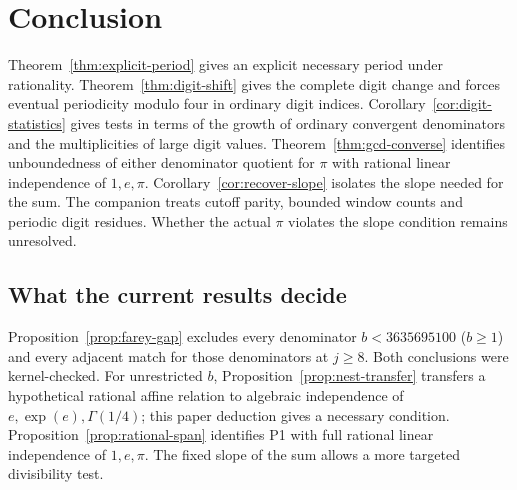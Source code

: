 \documentclass[11pt]{amsart}
\theoremstyle{definition}
\theoremstyle{remark}
\numberwithin{equation}{section}
\begin{document}
\section{Conclusion}\label{sec:conclusion}
Theorem~\ref{thm:explicit-period} gives an explicit necessary period under rationality. Theorem~\ref{thm:digit-shift} gives the complete digit change and forces eventual periodicity modulo four in ordinary digit indices. Corollary~\ref{cor:digit-statistics} gives tests in terms of the growth of ordinary convergent denominators and the multiplicities of large digit values. Theorem~\ref{thm:gcd-converse} identifies unboundedness of either denominator quotient for $\pi$ with rational linear independence of $1,e,\pi$. Corollary~\ref{cor:recover-slope} isolates the slope needed for the sum. The companion treats cutoff parity, bounded window counts and periodic digit residues. Whether the actual $\pi$ violates the slope condition remains unresolved.

\subsection{What the current results decide}\label{sec:current-results}
Proposition~\ref{prop:farey-gap} excludes every denominator
$b<3635695100$ ($b\ge1$) and every adjacent match for those denominators
at $j\ge8$. Both conclusions were kernel-checked. For unrestricted $b$,
Proposition~\ref{prop:nest-transfer} transfers a hypothetical rational
affine relation to algebraic independence of $e,\exp(e),\Gamma(1/4)$;
this paper deduction gives a necessary condition. Proposition~\ref{prop:rational-span}
identifies P1 with full rational linear independence of $1,e,\pi$.
The fixed slope of the sum allows a more targeted divisibility test.
\end{document}
